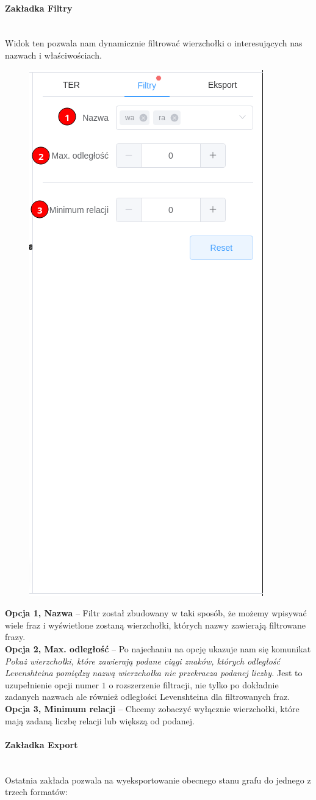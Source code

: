 \documentclass[12pt, a4paper]{article}
\newcommand{\subsubsubsection}[1]{\paragraph{#1}\mbox{}\\}
\begin{document}
\subsubsubsection{Zakładka Filtry}

Widok ten pozwala nam dynamicznie filtrować wierzchołki o interesujących nas nazwach i właściwościach.

\begin{figure}[H]
    \centering
    \includegraphics[width=0.4\linewidth]{images/graph-filters.png}
\end{figure}

\noindent \textbf{Opcja 1, Nazwa} --  Filtr został zbudowany w taki sposób, że możemy wpisywać wiele fraz i wyświetlone zostaną wierzchołki, których nazwy zawierają filtrowane frazy.\\

\noindent \textbf{Opcja 2, Max. odległość} -- Po najechaniu na opcję ukazuje nam się komunikat \textit{Pokaż wierzchołki, które zawierają podane ciągi znaków, których odległość Levenshteina pomiędzy nazwą wierzchołka nie przekracza podanej liczby.} Jest to uzupełnienie opcji numer $1$ o rozszerzenie filtracji, nie tylko po dokładnie zadanych nazwach ale również odległości Levenshteina dla filtrowanych fraz.\\

\noindent \textbf{Opcja 3, Minimum relacji} -- Chcemy zobaczyć wyłącznie wierzchołki, które mają zadaną liczbę relacji lub większą od podanej.

\subsubsubsection{Zakładka Export}

Ostatnia zakłada pozwala na wyeksportowanie obecnego stanu grafu do jednego z trzech formatów:
\end{document}
